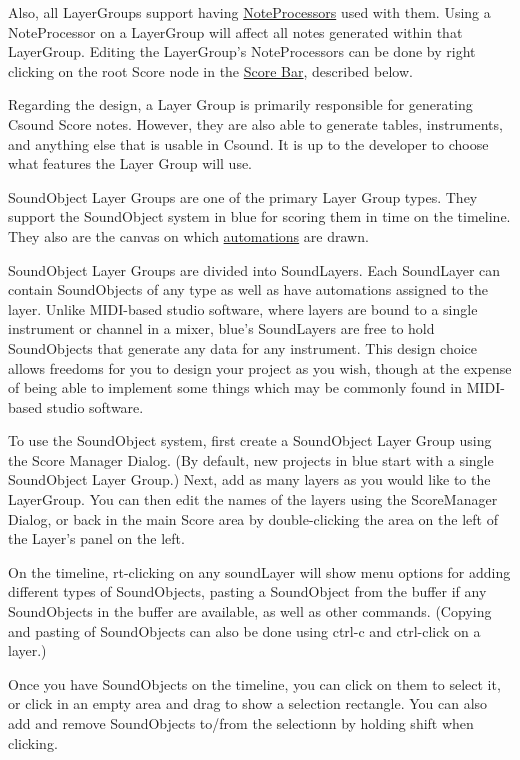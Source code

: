 Also, all LayerGroups support having
\protect\hyperlink{noteProcessors}{NoteProcessors} used with them. Using
a NoteProcessor on a LayerGroup will affect all notes generated within
that LayerGroup. Editing the LayerGroup's NoteProcessors can be done by
right clicking on the root Score node in the
\protect\hyperlink{scoreBar}{Score Bar}, described below.

Regarding the design, a Layer Group is primarily responsible for
generating Csound Score notes. However, they are also able to generate
tables, instruments, and anything else that is usable in Csound. It is
up to the developer to choose what features the Layer Group will use.

SoundObject Layer Groups are one of the primary Layer Group types. They
support the SoundObject system in blue for scoring them in time on the
timeline. They also are the canvas on which
\protect\hyperlink{parameterAutomation}{automations} are drawn.

SoundObject Layer Groups are divided into SoundLayers. Each SoundLayer
can contain SoundObjects of any type as well as have automations
assigned to the layer. Unlike MIDI-based studio software, where layers
are bound to a single instrument or channel in a mixer, blue's
SoundLayers are free to hold SoundObjects that generate any data for any
instrument. This design choice allows freedoms for you to design your
project as you wish, though at the expense of being able to implement
some things which may be commonly found in MIDI-based studio software.

To use the SoundObject system, first create a SoundObject Layer Group
using the Score Manager Dialog. (By default, new projects in blue start
with a single SoundObject Layer Group.) Next, add as many layers as you
would like to the LayerGroup. You can then edit the names of the layers
using the ScoreManager Dialog, or back in the main Score area by
double-clicking the area on the left of the Layer's panel on the left.

On the timeline, rt-clicking on any soundLayer will show menu options
for adding different types of SoundObjects, pasting a SoundObject from
the buffer if any SoundObjects in the buffer are available, as well as
other commands. (Copying and pasting of SoundObjects can also be done
using ctrl-c and ctrl-click on a layer.)

Once you have SoundObjects on the timeline, you can click on them to
select it, or click in an empty area and drag to show a selection
rectangle. You can also add and remove SoundObjects to/from the
selectionn by holding shift when clicking.

